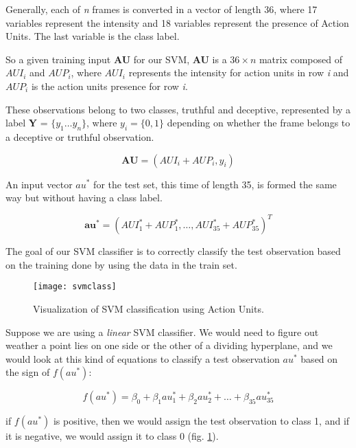 Generally, each of \textit{n} frames is converted in a vector of length 36, where 17 variables represent the intensity and 18 variables represent the presence of Action Units. The last variable is the class label.

So a given training input \textbf{AU} for our SVM, \textbf{AU} is a $36 \times n$ matrix composed of $AUI_i$ and $AUP_i$, where $AUI_i$ represents the intensity for action units in row \textit{i} and $AUP_i$ is the action units presence for row \textit{i}. 

These observations belong to two classes, truthful and deceptive, represented by a label \textbf{Y} = $\{y_1 \dots y_n\}$, where $y_i = \{0,1\}$ depending on whether the frame belongs to a deceptive or truthful observation.

\begin{equation}
	\mathbf{AU} = (AUI_i + AUP_i, y_i)
\end{equation}

An input vector $au^*$ for the test set, this time of length 35, is formed the same way but without having a class label.

\begin{equation}
	\mathbf{au^*} = (AUI^*_1 + AUP^*_1, \dots, AUI^*_{35} + AUP^*_{35})^T
\end{equation}

The goal of our SVM classifier is to correctly classify the test observation based on the training done by using the data in the train set.

\begin{figure}[H]
	\centering
	\texttt{[image: svmclass]}
	\caption{Visualization of SVM classification using Action Units.}
	\label{fig:svmclass}
\end{figure}

Suppose we are using a \textit{linear} SVM classifier. We would need to figure out weather a point lies on one side or the other of a dividing hyperplane, and we would look at this kind of equations to classify a test observation $au^*$ based on the sign of $f(au^*)$:

\begin{equation} 
	f(au^*) = \beta_0 + \beta_1 au^*_{1} + \beta_2 au^*_{2} + \dots + \beta_{35} au^*_{35}
\end{equation}

if $f(au^*)$ is positive, then we would assign the test observation to class 1, and if it is negative, we would assign it to class 0 (fig. \ref{fig:svmclass}).

